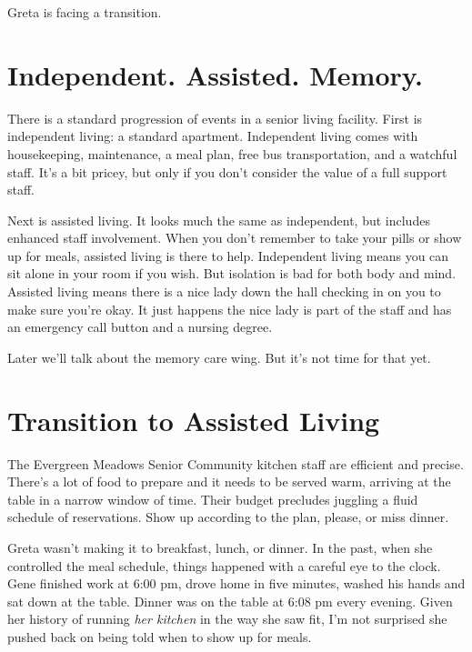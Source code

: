 \documentclass[
  letterpaper,
  DIV=11,
  numbers=noendperiod]{scrreprt}
\begin{document}
Greta is facing a transition.

\section*{Independent. Assisted.
Memory.}\label{independent.-assisted.-memory.}


There is a standard progression of events in a senior living facility.
First is independent living: a standard apartment. Independent living
comes with housekeeping, maintenance, a meal plan, free bus
transportation, and a watchful staff. It's a bit pricey, but only if you
don't consider the value of a full support staff.

Next is assisted living. It looks much the same as independent, but
includes enhanced staff involvement. When you don't remember to take
your pills or show up for meals, assisted living is there to help.
Independent living means you can sit alone in your room if you wish. But
isolation is bad for both body and mind. Assisted living means there is
a nice lady down the hall checking in on you to make sure you're okay.
It just happens the nice lady is part of the staff and has an emergency
call button and a nursing degree.

Later we'll talk about the memory care wing. But it's not time for that
yet.

\section*{Transition to Assisted
Living}\label{transition-to-assisted-living}


The Evergreen Meadows Senior Community kitchen staff are efficient and
precise. There's a lot of food to prepare and it needs to be served
warm, arriving at the table in a narrow window of time. Their budget
precludes juggling a fluid schedule of reservations. Show up according
to the plan, please, or miss dinner.

Greta wasn't making it to breakfast, lunch, or dinner. In the past, when
she controlled the meal schedule, things happened with a careful eye to
the clock. Gene finished work at 6:00 pm, drove home in five minutes,
washed his hands and sat down at the table. Dinner was on the table at
6:08 pm every evening. Given her history of running \emph{her kitchen}
in the way she saw fit, I'm not surprised she pushed back on being told
when to show up for meals.
\end{document}
